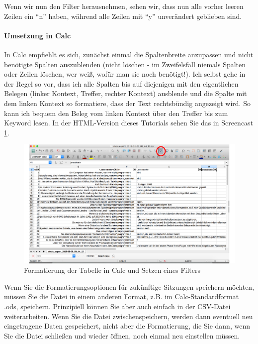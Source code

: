 \documentclass[]{article}
\let\oldparagraph\paragraph
\renewcommand{\paragraph}[1]{\oldparagraph{#1}\mbox{}}
\begin{document}
Wenn wir nun den Filter herausnehmen, sehen wir, dass nun alle vorher
leeren Zeilen ein ``n'' haben, während alle Zeilen mit ``y'' unverändert
geblieben sind.

\hypertarget{umsetzung-in-calc}{\paragraph{Umsetzung in
Calc}\label{umsetzung-in-calc}}

In Calc empfiehlt es sich, zunächst einmal die Spaltenbreite anzupassen
und nicht benötigte Spalten auszublenden (nicht löschen - im
Zweifelsfall niemals Spalten oder Zeilen löschen, wer weiß, wofür man
sie noch benötigt!). Ich selbst gehe in der Regel so vor, dass ich alle
Spalten bis auf diejenigen mit den eigentlichen Belegen (linker Kontext,
Treffer, rechter Kontext) ausblende und die Spalte mit dem linken
Kontext so formatiere, dass der Text rechtsbündig angezeigt wird. So
kann ich bequem den Beleg vom linken Kontext über den Treffer bis zum
Keyword lesen. In der HTML-Version dieses Tutorials sehen Sie das in
Screencast \ref{fig:calcformat}.

\begin{figure}
\includegraphics[width=6.66in]{docs/fig/calcformat} \caption{Formatierung der Tabelle in Calc und Setzen eines Filters}\label{fig:calcformat}
\end{figure}

Wenn Sie die Formatierungsoptionen für zukünftige Sitzungen speichern
möchten, müssen Sie die Datei in einem anderen Format, z.B. im
Calc-Standardformat .ods, speichern. Prinzipiell können Sie aber auch
einfach in der CSV-Datei weiterarbeiten. Wenn Sie die Datei
zwischenspeichern, werden dann eventuell neu eingetragene Daten
gespeichert, nicht aber die Formatierung, die Sie dann, wenn Sie die
Datei schließen und wieder öffnen, noch einmal neu einstellen müssen.
\end{document}
